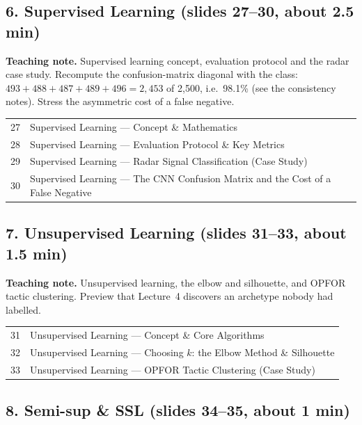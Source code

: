\documentclass[11pt]{article}
\begin{document}
\subsection{6. Supervised Learning \normalfont\small\color{GreyN}(slides 27--30, about 2.5 min)}

\textbf{Teaching note.} Supervised learning concept, evaluation protocol and the radar case study. Recompute the confusion-matrix diagonal with the class: $493+488+487+489+496=2{,}453$ of 2,500, i.e.\ 98.1\% (see the consistency notes). Stress the asymmetric cost of a false negative.

\begin{center}\small\renewcommand{\arraystretch}{1.1}\begin{tabularx}{\textwidth}{@{}r X@{}}27 & Supervised Learning --- Concept \& Mathematics\\
28 & Supervised Learning --- Evaluation Protocol \& Key Metrics\\
29 & Supervised Learning --- Radar Signal Classification (Case Study)\\
30 & Supervised Learning --- The CNN Confusion Matrix and the Cost of a False Negative\\\end{tabularx}\end{center}

\subsection{7. Unsupervised Learning \normalfont\small\color{GreyN}(slides 31--33, about 1.5 min)}

\textbf{Teaching note.} Unsupervised learning, the elbow and silhouette, and OPFOR tactic clustering. Preview that Lecture~4 discovers an archetype nobody had labelled.

\begin{center}\small\renewcommand{\arraystretch}{1.1}\begin{tabularx}{\textwidth}{@{}r X@{}}31 & Unsupervised Learning --- Concept \& Core Algorithms\\
32 & Unsupervised Learning --- Choosing $k$: the Elbow Method \& Silhouette\\
33 & Unsupervised Learning --- OPFOR Tactic Clustering (Case Study)\\\end{tabularx}\end{center}

\subsection{8. Semi-sup \& SSL \normalfont\small\color{GreyN}(slides 34--35, about 1 min)}
\end{document}
